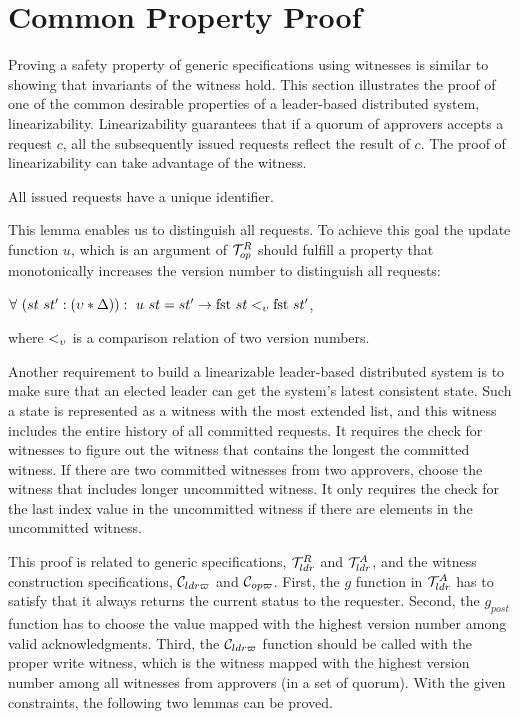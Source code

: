 \section{Common Property Proof}
\label{chapter:witnesspassing:sec:prove-safety-with-witness}

Proving a safety property of generic specifications using witnesses is similar to showing that invariants of the witness hold.
This section illustrates the proof of one of the common desirable properties
of a leader-based distributed system, linearizability.
Linearizability guarantees that if a quorum of approvers accepts a request $c$, 
all the subsequently issued requests reflect the result of $c$. 
The proof of linearizability can take advantage of the witness. 

\begin{lemma}
All issued requests have a unique identifier.
\end{lemma}

This lemma enables us to distinguish all requests. To achieve this goal the 
update function $u$, which is an argument of $\mathcal{T}^{R}_{op}$ should fulfill a 
property that monotonically increases the version number to distinguish all
requests:
\begin{center}
$\forall \ (st \ st' : (\upsilon * \Delta)) : \ u \ st = st' \rightarrow \text{fst }st
<_{\upsilon}  \text{fst }st'$,
\end{center}
where $<_{\upsilon}$ is a comparison relation of two version numbers.


Another requirement to build a linearizable leader-based distributed system is to make sure that an elected leader can get the system's latest consistent
state. Such a state is represented as a witness with the most extended list, and this witness includes the entire history of all committed requests. 
It requires the check for witnesses to figure out the witness that contains the longest the committed witness. If there are two committed witnesses from two approvers, choose the witness that includes longer uncommitted witness. It only requires the check for the last index value in the uncommitted witness if there are elements in the uncommitted witness.


This proof is related to generic specifications, $\mathcal{T}^{R}_{ldr}$ and $\mathcal{T}^{A}_{ldr}$, 
and the witness construction specifications, $\mathcal{C}_{ldr\varpi}$ and $\mathcal{C}_{op\varpi}$.
First, the $g$ function in $\mathcal{T}^{A}_{ldr}$ has to satisfy that  
it always returns the current status to the requester.
Second, the $g_{post}$ function has to choose the value mapped with the highest version number among valid acknowledgments. 
Third, the $\mathcal{C}_{ldr\varpi}$ function should be called with the proper write witness, which is the witness mapped with the highest version number among all witnesses from  approvers (in a set of quorum).
With the given constraints, the following two lemmas can be proved.

